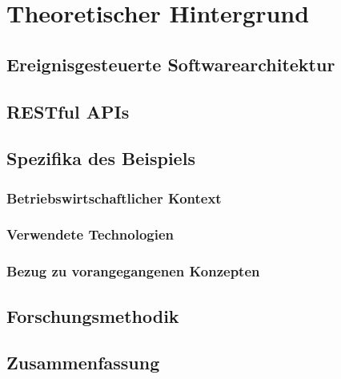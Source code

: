 \section{Theoretischer Hintergrund}
\subsection{Ereignisgesteuerte Softwarearchitektur}
\label{Abschnitt:Arbeitsumfeld}
\subsection{RESTful APIs}
\subsection{Spezifika des Beispiels}
\subsubsection{Betriebswirtschaftlicher Kontext}
\subsubsection{Verwendete Technologien}
\subsubsection{Bezug zu vorangegangenen Konzepten}
\subsection{Forschungsmethodik}
\subsection{Zusammenfassung}



 
